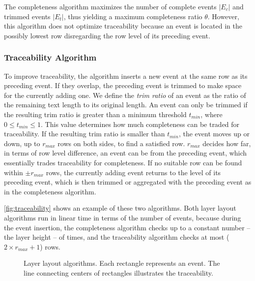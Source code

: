 The completeness algorithm maximizes the number of complete events $|E_c|$ and trimmed events $|E_t|$, thus yielding a maximum completeness ratio $\theta$. However, this algorithm does not optimize traceability because an event is located in the possibly lowest row disregarding the row level of its preceding event.

\subsubsection{Traceability Algorithm}
To improve traceability, the algorithm inserts a new event at the same row as its preceding event. If they overlap, the preceding event is trimmed to make space for the currently adding one. We define the \emph{trim ratio} of an event as the ratio of the remaining text length to its original length. An event can only be trimmed if the resulting trim ratio is greater than a minimum threshold $t_{min}$, where $0\leq t_{min} \leq 1$. This value determines how much completeness can be traded for traceability. If the resulting trim ratio is smaller than $t_{min}$, the event moves up or down, up to $r_{max}$ rows on both sides, to find a satisfied row. $r_{max}$ decides how far, in terms of row level difference, an event can be from the preceding event, which essentially trades traceability for completeness. If no suitable row can be found within $\pm r_{max}$ rows, the currently adding event returns to the level of its preceding event, which is then trimmed or aggregated with the preceding event as in the completeness algorithm.

\autoref{fig:traceability} shows an example of these two algorithms. Both layer layout algorithms run in linear time in terms of the number of events, because during the event insertion, the completeness algorithm checks up to a constant number -- the layer height -- of times, and the traceability algorithm checks at most ($2 \times r_{max}+1$) rows.

\begin{figure}[!htb]
\centering
	\hfill
\caption{Layer layout algorithms. Each rectangle represents an event. The line connecting centers of rectangles illustrates the  traceability.}
\label{fig:traceability}
\end{figure}

